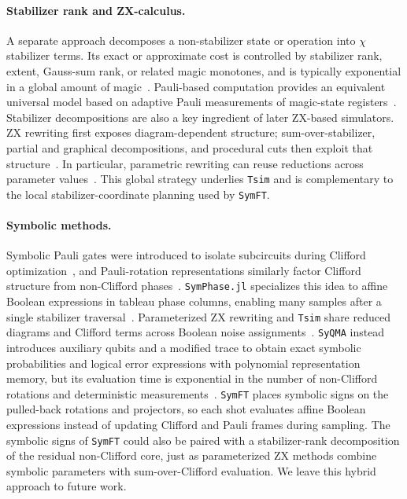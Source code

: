 \documentclass[a4paper,onecolumn,unpublished]{quantumarticle}
\newcommand{\tFont}[1]{\texttt{#1}}
\newcommand{\symft}{\tFont{SymFT}}
\newcommand{\tsim}{\tFont{Tsim}}
\newcommand{\syqma}{\tFont{SyQMA}}
\newcommand{\symphase}{\tFont{SymPhase.jl}}
\begin{document}
\paragraph{Stabilizer rank and ZX-calculus.}
A separate approach decomposes a non-stabilizer state or operation into $\chi$ stabilizer terms.
Its exact or approximate cost is controlled by stabilizer rank, extent, Gauss-sum rank, or related magic monotones, and is typically exponential in a global amount of magic~\cite{BG16,BBC+19,MT24,HL19,QPG21,SRP+21,PRK22,Kocia22}.
Pauli-based computation provides an equivalent universal model based on adaptive Pauli measurements of magic-state registers~\cite{BSS16}.
Stabilizer decompositions are also a key ingredient of later ZX-based simulators. 
ZX rewriting first exposes diagram-dependent structure; sum-over-stabilizer, partial and graphical decompositions, and procedural cuts then exploit that structure~\cite{KW22,KWV22,SK24,SK25}.
In particular, parametric rewriting can reuse reductions across parameter values~\cite{SK25}.
This global strategy underlies \tsim{} and is complementary to the local stabilizer-coordinate planning used by \symft{}.

\paragraph{Symbolic methods.}
Symbolic Pauli gates were introduced to isolate subcircuits during Clifford optimization~\cite{BSH+21}, and Pauli-rotation representations similarly factor Clifford structure from non-Clifford phases~\cite{ZC19}.
\symphase{} specializes this idea to affine Boolean expressions in tableau phase columns, enabling many samples after a single stabilizer traversal~\cite{FY24b,FY24a}.
Parameterized ZX rewriting and \tsim{} share reduced diagrams and Clifford terms across Boolean noise assignments~\cite{SK25,HLZ26}.
\syqma{} instead introduces auxiliary qubits and a modified trace to obtain exact symbolic probabilities and logical error expressions with polynomial representation memory, but its evaluation time is exponential in the number of non-Clifford rotations and deterministic measurements~\cite{UA26}.
\symft{} places symbolic signs on the pulled-back rotations and projectors, so each shot evaluates affine Boolean expressions instead of updating Clifford and Pauli frames during sampling.
The symbolic signs of \symft{} could also be paired with a stabilizer-rank decomposition of the residual non-Clifford core, just as parameterized ZX methods combine symbolic parameters with sum-over-Clifford evaluation. We leave this hybrid approach to future work.
\end{document}
